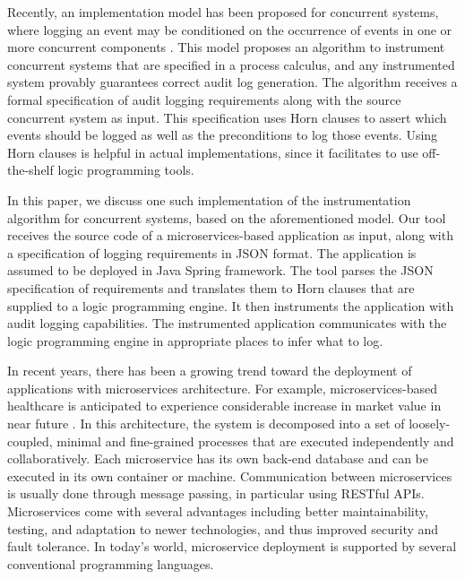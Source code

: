 Recently, an implementation model has been proposed for concurrent systems, where logging an event may be conditioned on the occurrence of events in one or more concurrent components  \cite{lsfa20}. This model proposes an algorithm to instrument concurrent systems that are specified in  a process calculus, and any instrumented system provably guarantees correct audit log generation. The algorithm receives a formal specification of audit logging requirements along with the source concurrent system as input. This specification uses Horn clauses to assert which events should be logged as well as the preconditions to log those events. Using Horn clauses is helpful in actual implementations, since it facilitates to use off-the-shelf logic programming tools. 

In this paper, we discuss one such implementation of the instrumentation algorithm for concurrent systems, based on the aforementioned model. Our tool receives the source code of a microservices-based application as input, along with a specification of logging requirements in JSON format. The application is assumed to be deployed in Java Spring framework. The tool parses the JSON specification of requirements and translates them to Horn clauses that are supplied to a logic programming engine. It then instruments the application with audit logging capabilities. The instrumented application communicates with the logic programming engine in appropriate places to infer what to log. 

In recent years, there has been a growing trend toward the deployment of applications with microservices architecture.  For example, microservices-based healthcare is anticipated to experience considerable increase in market value in near future \cite{zion}. In this architecture, the system is decomposed into a set of loosely-coupled, minimal and fine-grained processes that are executed independently and collaboratively. Each microservice has its own back-end database and can be executed in its own container or machine. Communication between microservices is usually done through message passing, in particular using RESTful APIs. Microservices come with several advantages including better maintainability, testing, and adaptation to newer technologies, and thus improved security and fault tolerance. In today's world, microservice deployment is supported by several conventional programming languages. %

